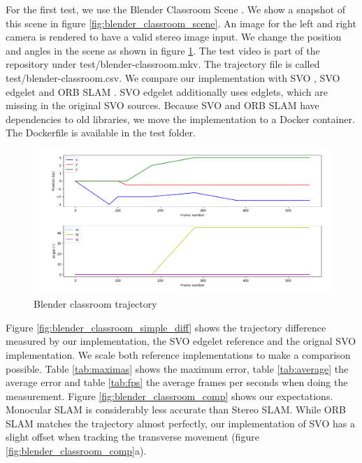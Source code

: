 \documentclass[11pt,a4paper,titlepage,oneside]{report}
\begin{document}
For the first test, we use the Blender Classroom Scene \cite{blender}. We show a snapshot of this scene in figure \ref{fig:blender_classroom_scene}. An image for the left and right camera is rendered to have a valid stereo image input. We change the position and angles in the scene as shown in figure \ref{fig:blender_classroom_simple_traj}. The test video is part of the repository under test/blender-classroom.mkv. The trajectory file is called test/blender-classroom.csv. We compare our implementation with SVO \cite{svo}, SVO edgelet \cite{svo_edglet} and ORB SLAM \cite{orbslam}. SVO edgelet additionally uses edglets, which are missing in the original SVO sources. Because SVO and ORB SLAM have dependencies to old libraries, we move the implementation to a Docker container. The Dockerfile is available in the test folder.

\begin{figure}[H]
  \centering
  \includegraphics[width=1.0\textwidth]{img/blender_classroom_simple_traj.png}
  \caption{Blender classroom trajectory}\label{fig:blender_classroom_simple_traj}
\end{figure}

Figure \ref{fig:blender_classroom_simple_diff} shows the trajectory difference measured by our implementation, the SVO edgelet reference and the orignal SVO implementation. We scale both reference implementations to make a comparison possible. Table \ref{tab:maximas} shows the maximum error, table \ref{tab:average} the average error and table \ref{tab:fps} the average frames per seconds when doing the measurement. Figure \ref{fig:blender_classroom_comp} shows our expectations. Monocular SLAM is considerably less accurate than Stereo SLAM. While ORB SLAM matches the trajectory almost perfectly, our implementation of SVO has a slight offset when tracking the transverse movement (figure \ref{fig:blender_classroom_comp}a).
\end{document}
